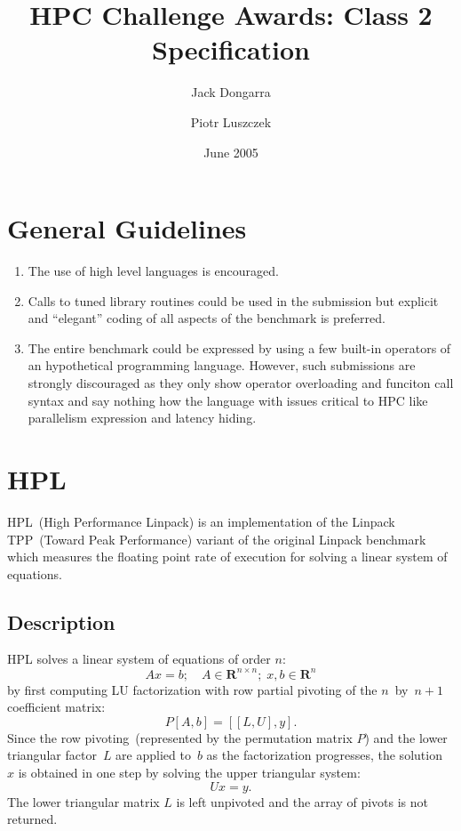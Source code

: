 \documentclass[twocolumn,draft]{article}
\newcommand{\HPL}{\textsf{HPL}\xspace}
\begin{document}
\title{HPC Challenge Awards: Class 2 Specification}
\author{Jack Dongarra \and Piotr Luszczek}
\date{June 2005}
\maketitle

\tableofcontents

\section{General Guidelines}
\begin{enumerate}
\item The use of high level languages is encouraged.
\item Calls to tuned library routines could be used in the submission but
  explicit and ``elegant'' coding of all aspects of the benchmark is preferred.
\item The entire benchmark could be expressed by using a few built-in operators
  of an hypothetical programming language. However, such submissions are
  strongly discouraged as they only show operator overloading and funciton call
  syntax and say nothing how the language with issues critical to HPC like
  parallelism expression and latency hiding.
\end{enumerate}

\section{\HPL}
\HPL~(High Performance Linpack) is an implementation of the Linpack TPP~(Toward
Peak Performance) variant of the original Linpack benchmark which measures the
floating point rate of execution for solving a linear system of equations.
\subsection{Description}
\HPL solves a linear system of equations of order $n$:
\begin{equation}
A x = b;\quad A\in\mathbf{R}^{n\times n};\; x,b\in\mathbf{R}^n
\label{eqn:axb}
\end{equation}
by first computing LU factorization with row partial pivoting of the
$n$~by~$n+1$ coefficient matrix:
\begin{equation}
P [A, b] = [[L,U], y].
\label{eqn:lu}
\end{equation}
Since the row pivoting~(represented by the permutation matrix $P$) and
the lower triangular factor~$L$ are applied to~$b$ as the factorization
progresses, the solution~$x$ is obtained in one step by solving the upper
triangular system:
\begin{equation}
  Ux = y.
\label{eqn:ubsolve}
\end{equation}
The lower triangular matrix $L$ is left unpivoted and the array of pivots is
not returned.
\end{document}
